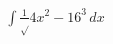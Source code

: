 \documentclass[preview]{standalone}
\begin{document}
\begin{align*}
\int \frac{1} \sqrt{4x^2-16 ^3} \, dx
\end{align*}
\end{document}
